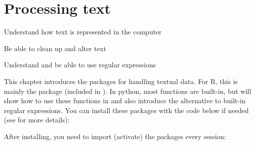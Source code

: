 \chapter{Processing text}
\label{chap:protext}


\begin{abstract}{Abstract}
Many data sets that are relevant for social science consist of textual data, from political discussions and newspaper archives to open-ended survey questions and reviews. This chapter gives an introduction in dealing with textual data using base R and Python, as well as packages such as  and  in R, or  and  in Python, and shows how to solve common problems encountered when reading and processing text. 
\end{abstract}


\begin{objectives}
\item Understand how text is represented in the computer
\item Be able to clean up and alter text
\item Understand and be able to use regular expressions 
\end{objectives}


\newpage
\begin{feature}
  This chapter introduces the packages for handling textual data.
  For R, this is mainly the  package (included in \tidyverse).
  In python, most functions are built-in, but will show how to use these functions in  and also introduce the  alternative to built-in regular expressions.
You can install these packages with the code below if needed  (see  for more details):


\noindent After installing, you need to import (activate) the packages every session:


\end{feature}







